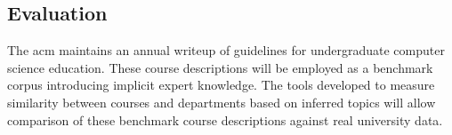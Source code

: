 \subsection{Evaluation}
\label{sec:evaluation}


The \ac{acm} maintains an annual writeup of guidelines for undergraduate computer science education. \cite{CS2013}
These course descriptions will be employed as a benchmark corpus introducing implicit expert knowledge.
The tools developed to measure similarity between courses and departments based on inferred topics will allow comparison of these benchmark course descriptions against real university data.


%



